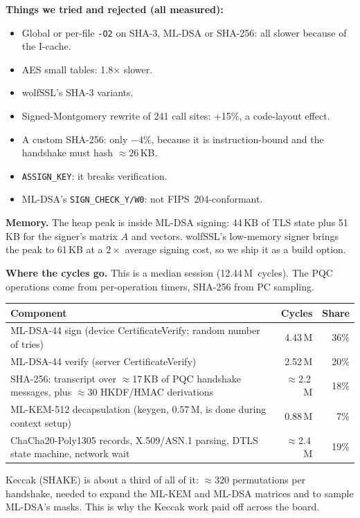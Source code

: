\documentclass[10pt,a4paper]{article}
\newcommand{\M}{\,M}
\begin{document}
\textbf{Things we tried and rejected (all measured):}
\begin{itemize}
  \item Global or per-file \texttt{-O2} on SHA-3, ML-DSA or SHA-256: all slower because of the I-cache.
  \item AES small tables: 1.8$\times$ slower.
  \item wolfSSL's SHA-3 variants.
  \item Signed-Montgomery rewrite of 241 call sites: +15\%, a code-layout effect.
  \item A custom SHA-256: only $-4\%$, because it is instruction-bound and the handshake must hash ${\approx}26$\,KB.
  \item \texttt{ASSIGN\_KEY}: it breaks verification.
  \item ML-DSA's \texttt{SIGN\_CHECK\_Y/W0}: not FIPS~204-conformant.
\end{itemize}

\textbf{Memory.} The heap peak is inside ML-DSA signing: 44\,KB of TLS state plus 51\,KB for the signer's
matrix $A$ and vectors. wolfSSL's low-memory signer brings the peak to 61\,KB at a $2\times$ average signing cost,
so we ship it as a build option.

\textbf{Where the cycles go.} This is a median session (12.44\M\ cycles). The PQC operations come from
per-operation timers, SHA-256 from PC sampling.

\begin{center}\small
\begin{tabular}{@{}lrr@{}}
\toprule
Component & Cycles & Share \\
\midrule
ML-DSA-44 sign (device CertificateVerify; random number of tries) & 4.43\M & 36\% \\
ML-DSA-44 verify (server CertificateVerify) & 2.52\M & 20\% \\
SHA-256: transcript over ${\approx}$17\,KB of PQC handshake messages, plus ${\approx}$30 HKDF/HMAC derivations & ${\approx}$2.2\M & 18\% \\
ML-KEM-512 decapsulation (keygen, 0.57\M, is done during context setup) & 0.88\M & 7\% \\
ChaCha20-Poly1305 records, X.509/ASN.1 parsing, DTLS state machine, network wait & ${\approx}$2.4\M & 19\% \\
\bottomrule
\end{tabular}
\end{center}

Keccak (SHAKE) is about a third of all of it: ${\approx}$320 permutations per handshake, needed to expand the
ML-KEM and ML-DSA matrices and to sample ML-DSA's masks. This is why the Keccak work paid off across the board.
\end{document}
